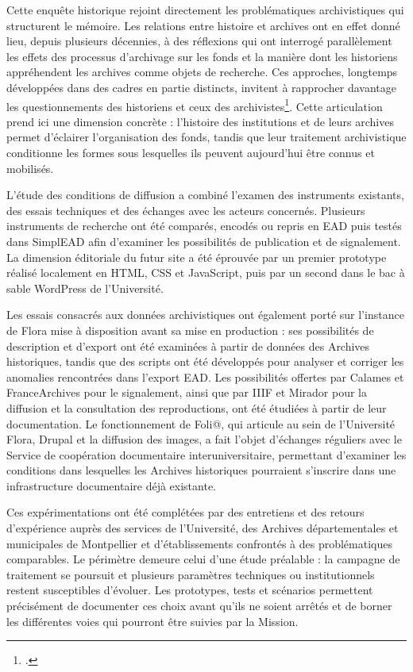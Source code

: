 Cette enquête historique rejoint directement les problématiques archivistiques qui structurent le mémoire. Les relations entre histoire et archives ont en effet donné lieu, depuis plusieurs décennies, à des réflexions qui ont interrogé parallèlement les effets des processus d'archivage sur les fonds et la manière dont les historiens appréhendent les archives comme objets de recherche. Ces approches, longtemps développées dans des cadres en partie distincts, invitent à rapprocher davantage les questionnements des historiens et ceux des archivistes\footcite{Poncet2019ArchivesHistoire}. Cette articulation prend ici une dimension concrète : l'histoire des institutions et de leurs archives permet d'éclairer l'organisation des fonds, tandis que leur traitement archivistique conditionne les formes sous lesquelles ils peuvent aujourd'hui être connus et mobilisés.

L'étude des conditions de diffusion a combiné l'examen des instruments existants, des essais techniques et des échanges avec les acteurs concernés. Plusieurs instruments de recherche ont été comparés, encodés ou repris en EAD puis testés dans SimplEAD afin d'examiner les possibilités de publication et de signalement. La dimension éditoriale du futur site a été éprouvée par un premier prototype réalisé localement en HTML, CSS et JavaScript, puis par un second dans le bac à sable WordPress de l'Université.

Les essais consacrés aux données archivistiques ont également porté sur l'instance de Flora mise à disposition avant sa mise en production : ses possibilités de description et d'export ont été examinées à partir de données des Archives historiques, tandis que des scripts ont été développés pour analyser et corriger les anomalies rencontrées dans l'export EAD. Les possibilités offertes par Calames et FranceArchives pour le signalement, ainsi que par IIIF et Mirador pour la diffusion et la consultation des reproductions, ont été étudiées à partir de leur documentation. Le fonctionnement de Foli@, qui articule au sein de l'Université Flora, Drupal et la diffusion des images, a fait l'objet d'échanges réguliers avec le Service de coopération documentaire interuniversitaire, permettant d'examiner les conditions dans lesquelles les Archives historiques pourraient s'inscrire dans une infrastructure documentaire déjà existante.

Ces expérimentations ont été complétées par des entretiens et des retours d'expérience auprès des services de l'Université, des Archives départementales et municipales de Montpellier et d'établissements confrontés à des problématiques comparables. Le périmètre demeure celui d'une étude préalable : la campagne de traitement se poursuit et plusieurs paramètres techniques ou institutionnels restent susceptibles d'évoluer. Les prototypes, tests et scénarios permettent précisément de documenter ces choix avant qu'ils ne soient arrêtés et de borner les différentes voies qui pourront être suivies par la Mission.

